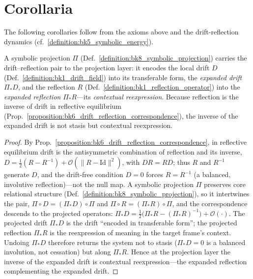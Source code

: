 \section{Corollaria}
\label{sec:bk8_corollaria}
The following corollaries follow from the axioms above and the drift-reflection dynamics (cf.~\ref{definition:bk5_symbolic_energy}).
\begin{corollary}
\label{corollary:bk8_projective_drift}
\leavevmode\newline
A symbolic projection $\Pi$ (Def.~\ref{definition:bk8_symbolic_projection}) carries the
drift--reflection pair to the projection layer: it encodes the local drift $D$
(Def.~\ref{definition:bk1_drift_field}) into its transferable form, the \emph{expanded
drift} $\Pi_{*}D$, and the reflection $R$ (Def.~\ref{definition:bk1_reflection_operator})
into the \emph{expanded reflection} $\Pi_{*}R$---its \emph{contextual reexpression}.
Because reflection is the inverse of drift in reflective equilibrium
(Prop.~\ref{proposition:bk6_drift_reflection_correspondence}), the inverse of the
expanded drift is not stasis but contextual reexpression.
\end{corollary}
\begin{proof}
\label{proof:bk8_projective_drift}
\leavevmode
By Prop.~\ref{proposition:bk6_drift_reflection_correspondence}, in reflective
equilibrium drift is the antisymmetric combination of reflection and its inverse,
$D = \tfrac{1}{2}(R - R^{-1}) + \mathcal{O}(\lVert R - \mathrm{Id}\rVert^2)$, with $DR = RD$;
thus $R$ and $R^{-1}$ generate $D$, and the drift-free condition $D = 0$ forces
$R = R^{-1}$ (a balanced, involutive reflection)---not the null map. A symbolic
projection $\Pi$ preserves core relational structure (Def.~\ref{definition:bk8_symbolic_projection}),
so it intertwines the pair, $\Pi \circ D = (\Pi_{*}D)\circ\Pi$ and
$\Pi \circ R = (\Pi_{*}R)\circ\Pi$, and the correspondence descends to the projected
operators: $\Pi_{*}D = \tfrac{1}{2}\bigl(\Pi_{*}R - (\Pi_{*}R)^{-1}\bigr) + \mathcal{O}(\cdot)$.
The projected drift $\Pi_{*}D$ is the drift ``encoded in transferable form''; the
projected reflection $\Pi_{*}R$ is the reexpression of meaning in the target frame's
context. Undoing $\Pi_{*}D$ therefore returns the system not to stasis
($\Pi_{*}D = 0$ is a balanced involution, not cessation) but along $\Pi_{*}R$. Hence
at the projection layer the inverse of the expanded drift is contextual
reexpression---the expanded reflection complementing the expanded drift.
\end{proof}

